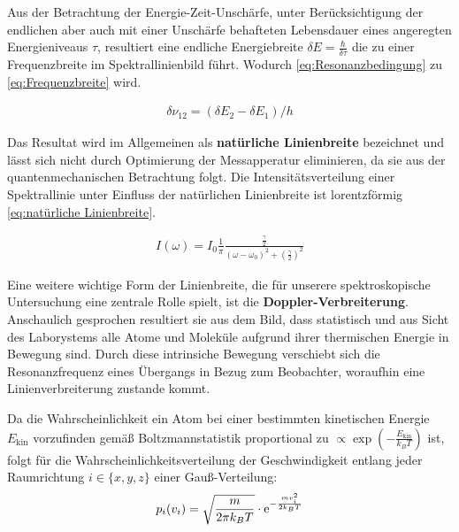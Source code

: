 \noindent Aus der Betrachtung der Energie-Zeit-Unschärfe, unter Berücksichtigung der endlichen aber auch mit einer Unschärfe behafteten Lebensdauer eines angeregten Energieniveaus $\tau$, resultiert eine endliche Energiebreite $\delta E= \frac{\hbar}{\delta \tau}$ die zu einer Frequenzbreite im Spektrallinienbild führt. Wodurch \ref{eq:Resonanzbedingung} zu \ref{eq:Frequenzbreite} wird.

\begin{align}
    \delta \nu_{12}=(\delta E_{2}-\delta E_{1})/ h \label{eq:Frequenzbreite}
\end{align}

\noindent Das Resultat wird im Allgemeinen als \textbf{natürliche Linienbreite} bezeichnet und lässt sich nicht durch Optimierung der Messapperatur eliminieren, da sie aus der quantenmechanischen Betrachtung folgt. Die Intensitätsverteilung einer Spektrallinie unter Einfluss der natürlichen Linienbreite ist lorentzförmig \ref{eq:natürliche Linienbreite}.

\begin{align}
    I(\omega)=I_{0}\frac{1}{\pi}\frac{\frac{\gamma}{2}}{(\omega-\omega_{0})^2+(\frac{\gamma}{2})^2} \label{eq:natürliche Linienbreite}
\end{align}

\noindent Eine weitere wichtige Form der Linienbreite, die für unserere spektroskopische Untersuchung eine zentrale Rolle spielt, ist die \textbf{Doppler-Verbreiterung}. Anschaulich gesprochen resultiert sie aus dem Bild, dass statistisch und aus Sicht des Laborystems alle Atome und Moleküle aufgrund ihrer thermischen Energie in Bewegung sind. Durch diese intrinsiche Bewegung verschiebt sich die Resonanzfrequenz eines Übergangs in Bezug zum Beobachter, woraufhin eine Linienverbreiterung zustande kommt.

\noindent Da die Wahrscheinlichkeit ein Atom bei einer bestimmten kinetischen Energie $E_{\text{kin}}$ vorzufinden gemäß Boltzmannstatistik proportional zu $\propto \exp(-\frac{E_{\text{kin}}}{k_{B}T})$ ist, folgt für die Wahrscheinlichkeitsverteilung der Geschwindigkeit entlang jeder Raumrichtung $i \in \{x,y,z\}$ einer Gauß-Verteilung:\\

\begin{align}
    p_{i}(v_{i}) = \sqrt{\frac{m}{2\pi k_{B}T}} \cdot \mathrm{e}^{- \frac{mv_{i}^2}{2k_{B}T}} \label{eq:Gaußverteilte Geschwindigkeit}\\\nonumber
\end{align}

